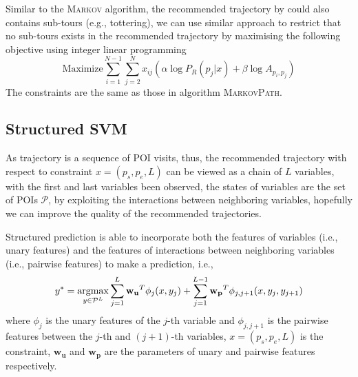Similar to the \textsc{Markov} algorithm,
the recommended trajectory by  could also contains sub-tours (e.g., tottering),
we can use similar approach to restrict that no sub-tours exists in the recommended trajectory
by maximising the following objective using integer linear programming
\begin{displaymath}
    \text{Maximize}  \sum_{i=1}^{N-1} \sum_{j=2}^N x_{ij} (\alpha \log P_R(p_j | x) + \beta \log A_{p_i, p_j})
\end{displaymath}
The constraints are the same as those in algorithm \textsc{MarkovPath}.

\subsection{Structured SVM}
\label{ssvm}
As trajectory is a sequence of POI visits,
thus, the recommended trajectory with respect to constraint $x = (p_s, p_e, L)$
can be viewed as a chain of $L$ variables,
with the first and last variables been observed, the states of variables are the set of POIs $\mathcal{P}$,
by exploiting the interactions between neighboring variables,
hopefully we can improve the quality of the recommended trajectories.

Structured prediction is able to incorporate both the features of variables (i.e., unary features) and
the features of interactions between neighboring variables (i.e., pairwise features) to make a prediction, i.e.,
\begin{displaymath}
    y^* = \operatorname*{argmax}_{y \in \mathcal{P}^L} \sum_{j=1}^L \mathbf{w_u}^T \phi_j(x, y_j) +
                                        \sum_{j=1}^{L-1} \mathbf{w_p}^T \phi_{j, j+1}(x, y_j, y_{j+1})
\end{displaymath}
where $\phi_j$ is the unary features of the $j$-th variable and $\phi_{j, j+1}$ is the pairwise features between
the $j$-th and $(j+1)$-th variables, $x = (p_s, p_e, L)$ is the constraint, $\mathbf{w_u}$ and $\mathbf{w_p}$ are the
parameters of unary and pairwise features respectively.

